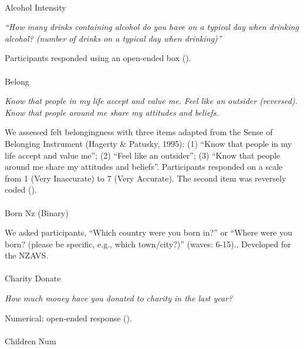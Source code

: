 \documentclass[
  single column]{article}
\makeatletter
\let\oldparagraph\paragraph
\renewcommand{\paragraph}{
    \@ifstar
      \xxxParagraphStar
      \xxxParagraphNoStar
  }
\newcommand{\xxxParagraphStar}[1]{\oldparagraph*{#1}\mbox{}}
\newcommand{\xxxParagraphNoStar}[1]{\oldparagraph{#1}\mbox{}}
\makeatother
\begin{document}
\paragraph{Alcohol Intensity}\label{alcohol-intensity}

\emph{``How many drinks containing alcohol do you have on a typical day
when drinking alcohol? (number of drinks on a typical day when
drinking)''}

Participants responded using an open-ended box
().

\paragraph{Belong}\label{belong}

\emph{Know that people in my life accept and value me.} \emph{Feel like
an outsider (reversed).} \emph{Know that people around me share my
attitudes and beliefs.}

We assessed felt belongingness with three items adapted from the Sense
of Belonging Instrument (Hagerty \& Patusky, 1995): (1) ``Know that
people in my life accept and value me''; (2) ``Feel like an outsider'';
(3) ``Know that people around me share my attitudes and beliefs''.
Participants responded on a scale from 1 (Very Inaccurate) to 7 (Very
Accurate). The second item was reversely coded
().

\paragraph{Born Nz (Binary)}\label{born-nz-binary}

We asked participants, ``Which country were you born in?'' or ``Where
were you born? (please be specific, e.g., which town/city?)'' (waves:
6-15).. Developed for the NZAVS.

\paragraph{Charity Donate}\label{charity-donate}

\emph{How much money have you donated to charity in the last year?}

Numerical: open-ended response
().

\paragraph{Children Num}\label{children-num}
\end{document}
